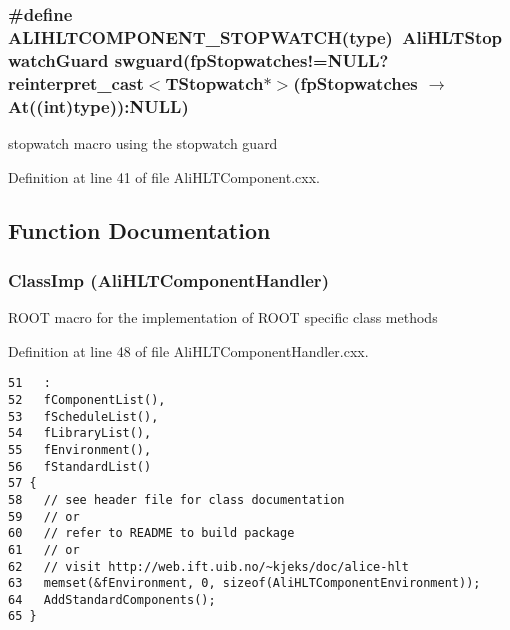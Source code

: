 \subsubsection{\setlength{\rightskip}{0pt plus 5cm}\#define ALIHLTCOMPONENT\_\-STOPWATCH(type)\ Ali\-HLTStopwatch\-Guard swguard(fp\-Stopwatches!=NULL?reinterpret\_\-cast$<$TStopwatch$\ast$$>$(fp\-Stopwatches $\rightarrow$ At((int)type)):NULL)}\label{AliHLTComponent_8cxx_a0}


stopwatch macro using the stopwatch guard 

Definition at line 41 of file Ali\-HLTComponent.cxx.

\subsection{Function Documentation}
\subsubsection{\setlength{\rightskip}{0pt plus 5cm}Class\-Imp ({\bf Ali\-HLTComponent\-Handler})}\label{AliHLTComponent_8cxx_a3}


ROOT macro for the implementation of ROOT specific class methods 

Definition at line 48 of file Ali\-HLTComponent\-Handler.cxx.

\footnotesize\begin{verbatim}51   :
52   fComponentList(),
53   fScheduleList(),
54   fLibraryList(),
55   fEnvironment(),
56   fStandardList()
57 {
58   // see header file for class documentation
59   // or
60   // refer to README to build package
61   // or
62   // visit http://web.ift.uib.no/~kjeks/doc/alice-hlt
63   memset(&fEnvironment, 0, sizeof(AliHLTComponentEnvironment));
64   AddStandardComponents();
65 }

\end{verbatim}\normalsize 


